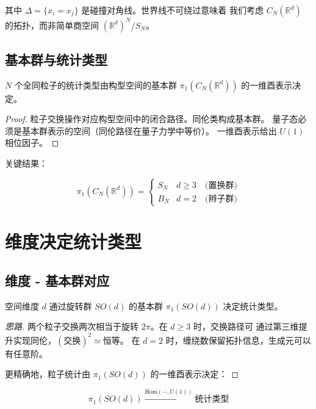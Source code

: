 \documentclass[11pt,a4paper]{article}
\begin{document}
其中 $\Delta = \{x_i = x_j\}$ 是碰撞对角线。世界线不可绕过意味着
我们考虑 $C_N(\mathbb{R}^d)$ 的拓扑，而非简单商空间 $(\mathbb{R}^d)^N/S_N$。

\subsection{基本群与统计类型}

\begin{proposition}[统计类型与基本群]
$N$ 个全同粒子的统计类型由构型空间的基本群 $\pi_1(C_N(\mathbb{R}^d))$ 的一维酉表示决定。
\end{proposition}

\begin{proof}
粒子交换操作对应构型空间中的闭合路径。同伦类构成基本群。
量子态必须是基本群表示的空间（同伦路径在量子力学中等价）。
一维酉表示给出 $U(1)$ 相位因子。
\end{proof}

关键结果：

\begin{equation}
\pi_1(C_N(\mathbb{R}^d)) =
\begin{cases}
S_N & d \geq 3 \quad\text{(置换群)} \\
B_N & d = 2 \quad\text{(辫子群)}
\end{cases}
\end{equation}

\section{维度决定统计类型}

\subsection{维度 - 基本群对应}

\begin{proposition}[维度决定基本群结构]
空间维度 $d$ 通过旋转群 $SO(d)$ 的基本群 $\pi_1(SO(d))$ 决定统计类型。
\end{proposition}

\begin{proof}[思路]
两个粒子交换两次相当于旋转 $2\pi$。在 $d \geq 3$ 时，交换路径可
通过第三维提升实现同伦，$(\text{交换})^2 \simeq \text{恒等}$。
在 $d = 2$ 时，缠绕数保留拓扑信息，生成元可以有任意阶。

更精确地，粒子统计由 $\pi_1(SO(d))$ 的一维酉表示决定：
\end{proof}

\begin{equation}
\pi_1(SO(d)) \xrightarrow{\text{Hom}(-,U(1))} \text{统计类型}
\end{equation}
\end{document}
